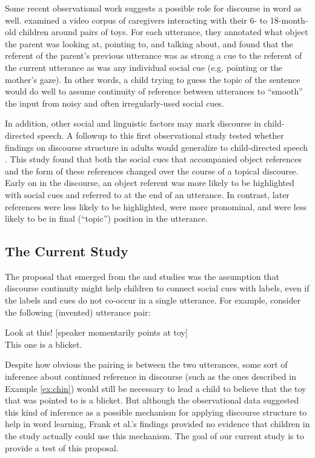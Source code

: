 \documentclass[man]{apa2}
\begin{document}
Some recent observational work suggests a possible role for discourse in word as well.  examined a video corpus of caregivers interacting with their 6- to 18-month-old children around pairs of toys. For each utterance, they annotated what object the parent was looking at, pointing to, and talking about, and found that the referent of the parent's previous utterance was as strong a cue to the referent of the current utterance as was any individual social cue (e.g. pointing or the mother's gaze). In other words, a child trying to guess the topic of the sentence would do well to assume continuity of reference between utterances to ``smooth'' the input from noisy and often irregularly-used social cues.

In addition, other social and linguistic factors may mark discourse in child-directed speech. A followup to this first observational study tested whether findings on discourse structure in adults would generalize to child-directed speech \cite{rohdeunderreview}. This study found that both the social cues that accompanied object references and the form of these references changed over the course of a topical discourse. Early on in the discourse, an object referent was more likely to be highlighted with social cues and referred to at the end of an utterance. In contrast, later references were less likely to be highlighted, were more pronominal, and were less likely to be in final (``topic'') position in the utterance. 

\subsection{The Current Study}

The proposal that emerged from the  and  studies was the assumption that discourse continuity might help children to connect social cues with labels, even if the labels and cues do not co-occur in a single utterance.  For example, consider the following (invented) utterance pair:

\begin{example}
Look at this! [speaker momentarily points at toy] \\
This one is a blicket.
\end{example}

\noindent Despite how obvious the pairing is between the two utterances, some sort of inference about continued reference in discourse (such as the ones described in Example \ref{ex:chin}) would still be necessary to lead a child to believe that the toy that was pointed to is a blicket.  But although the observational data suggested this kind of inference as a possible mechanism for applying discourse structure to help in word learning, Frank et al.'s findings provided no evidence that children in the study actually could use this mechanism.  The goal of our current study is to provide a test of this proposal. 
\end{document}
